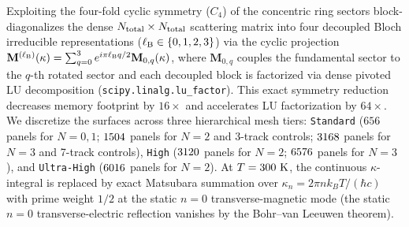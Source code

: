 \documentclass[pdflatex,sn-nature]{sn-jnl}
\begin{document}
Exploiting the four-fold cyclic symmetry ($C_4$) of the concentric ring sectors block-diagonalizes the dense $N_{\rm total} \times N_{\rm total}$ scattering matrix into four decoupled Bloch irreducible representations ($\ell_{\rm B} \in \{0, 1, 2, 3\}$) via the cyclic projection $\mathbf{M}^{(\ell_{\rm B})}(\kappa) = \sum_{q=0}^{3} e^{i\pi \ell_{\rm B} q/2}\mathbf{M}_{0,q}(\kappa)$, where $\mathbf{M}_{0,q}$ couples the fundamental sector to the $q$-th rotated sector and each decoupled block is factorized via dense pivoted LU decomposition (\texttt{scipy.linalg.lu\_factor}). This exact symmetry reduction decreases memory footprint by $16\times$ and accelerates LU factorization by $64\times$. We discretize the surfaces across three hierarchical mesh tiers: \texttt{Standard} ($656$ panels for $N=0,1$; $1504{}$ panels for $N=2$ and 3-track controls; $3168{}$ panels for $N=3$ and 7-track controls), \texttt{High} ($3120{}$ panels for $N=2$; $6576{}$ panels for $N=3$), and \texttt{Ultra-High} ($6016{}$ panels for $N=2$). At $T = 300{}\text{ K}$, the continuous $\kappa$-integral is replaced by exact Matsubara summation over $\kappa_n = 2\pi n k_B T / (\hbar c)$ with prime weight $1/2$ at the static $n=0$ transverse-magnetic mode (the static $n=0$ transverse-electric reflection vanishes by the Bohr--van Leeuwen theorem).
\end{document}
